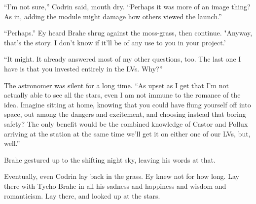 ``I'm not sure,'' Codrin said, mouth dry. ``Perhaps it was more of an image thing? As in, adding the module might damage how others viewed the launch.''

``Perhaps.'' Ey heard Brahe shrug against the moss-grass, then continue. "Anyway, that's the story. I don't know if it'll be of any use to you in your project.'

``It might. It already answered most of my other questions, too. The last one I have is that you invested entirely in the LVs. Why?''

The astronomer was silent for a long time. ``As upset as I get that I'm not actually able to see all the stars, even I am not immune to the romance of the idea. Imagine sitting at home, knowing that you could have flung yourself off into space, out among the dangers and excitement, and choosing instead that boring safety? The only benefit would be the combined knowledge of Castor and Pollux arriving at the station at the same time we'll get it on either one of our LVs, but, well.''

Brahe gestured up to the shifting night sky, leaving his words at that.

Eventually, even Codrin lay back in the grass. Ey knew not for how long. Lay there with Tycho Brahe in all his sadness and happiness and wisdom and romanticism. Lay there, and looked up at the stars.
